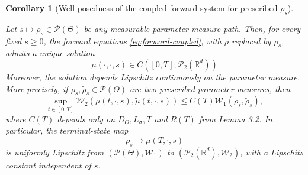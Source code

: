\documentclass[11pt,a4wide]{article}
\newtheorem{corollary}[theorem]{Corollary}
\theoremstyle{definition}
\newcommand{\R}{\mathbb{R}}
\newcommand{\Prob}{\mathcal{P}}
\newcommand{\Wass}{\mathcal{W}}
\begin{document}
\begin{corollary}[Well-posedness of the coupled forward system for prescribed $\rho_s$]
\label{cor:forward-wp}

Let $s \mapsto \rho_s\in\Prob(\Theta)$ be any measurable parameter-measure path. Then, for every fixed $s\geq 0$, the forward equations \eqref{eq:forward-coupled}, with  $\rho$ replaced by $\rho_s$, admits a unique solution  
\[
\mu(\cdot,\cdot,s)\in C([0,T];\Prob_2(\mathbb R^d))
\]
Moreover, the solution depends Lipschitz continuously on the parameter measure.  More precisely, if $\rho_s, \tilde \rho_s \in \mathcal P(\Theta)$ are two prescribed parameter measures, then
$$
\sup_{t\in [0, T]} \Wass_2(\mu(t, \cdot, s), \tilde \mu(t, \cdot, s)) \leq C(T) \Wass_1(\rho_s, \tilde \rho_s),  
$$
where $C(T)$ depends only on $D_\Theta, L_\sigma, T$ and $R(T)$ from Lemma 3.2. In particular, the terminal-state map
\[
\rho_s \longmapsto \mu(T,\cdot,s)
\]
is uniformly Lipschitz from $(\Prob(\Theta),\Wass_1)$ to $(\Prob_2(\mathbb R^d),\Wass_2)$, with a Lipschitz constant independent of $s$. 
\end{corollary}
\end{document}
